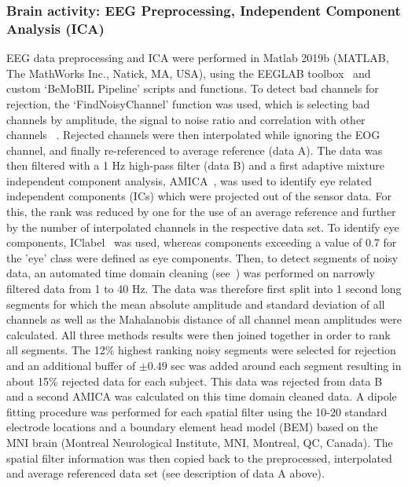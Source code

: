 \subsubsection{Brain activity: EEG Preprocessing, Independent Component Analysis (ICA)}
EEG data preprocessing and ICA were performed in Matlab 2019b (MATLAB, The MathWorks Inc., Natick, MA, USA), using the EEGLAB toolbox~\cite{Delorme2004-sn} and custom `BeMoBIL Pipeline' scripts and functions. To detect bad channels for rejection, the `FindNoisyChannel' function was used, which is selecting bad channels by amplitude, the signal to noise ratio and correlation with other channels ~\cite{Bigdely-Shamlo2015-ds}. Rejected channels were then interpolated while ignoring the EOG channel, and finally re-referenced to average reference (data A). The data was then filtered with a 1 Hz high-pass filter (data B) and a first adaptive mixture independent component analysis, AMICA~\cite{Palmer2011-zs}, was used to identify eye related independent components (ICs) which were projected out of the sensor data. For this, the rank was reduced by one for the use of an average reference and further by the number of interpolated channels in the respective data set. To identify eye components, IClabel~\cite{Pion-Tonachini2019-fy} was used, whereas components exceeding a value of 0.7 for the 'eye' class were defined as eye components. Then, to detect segments of noisy data, an automated time domain cleaning (see~\cite{gramann2021human}) was performed on narrowly filtered data from 1 to 40 Hz. The data was therefore first split into 1 second long segments for which the mean absolute amplitude and standard deviation of all channels as well as the Mahalanobis distance of all channel mean amplitudes were calculated. All three methods results were then joined together in order to rank all segments. The 12\% highest ranking noisy segments were selected for rejection and an additional buffer of $\pm 0.49$ sec was added around each segment resulting in about 15\% rejected data for each subject. This data was rejected from data B and a second AMICA was calculated on this time domain cleaned data. A dipole fitting procedure was performed for each spatial filter using the 10-20 standard electrode locations and a boundary element head model (BEM) based on the MNI brain (Montreal Neurological Institute, MNI, Montreal, QC, Canada). The spatial filter information was then copied back to the preprocessed, interpolated and average referenced data set (\textcolor{n}{see description of} data A \textcolor{n}{above}).

